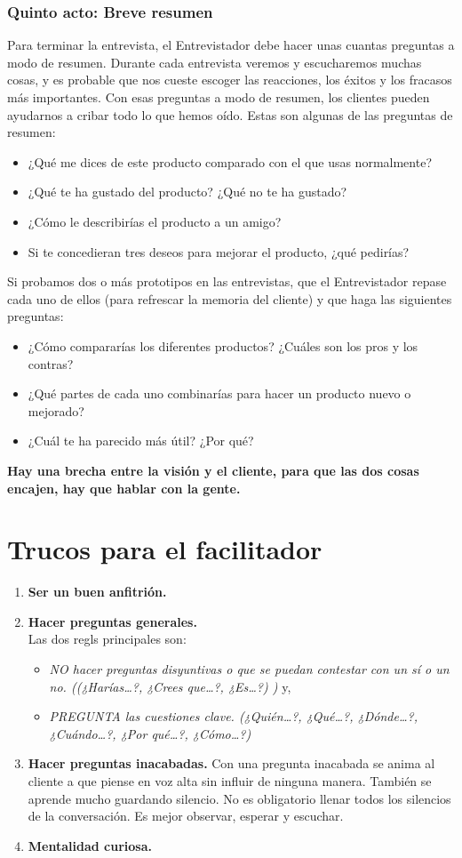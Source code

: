 \documentclass[10pt]{article}
\begin{document}
\begin{multicols}{2}
\subsubsection*{Quinto acto: Breve resumen}
Para terminar la entrevista, el Entrevistador debe hacer unas cuantas preguntas a modo de resumen. Durante cada entrevista veremos y escucharemos muchas cosas, y es probable que nos cueste escoger las reacciones, los éxitos y los fracasos más importantes. Con esas preguntas a modo de resumen, los clientes pueden ayudarnos a cribar todo lo que hemos oído. Estas son algunas de las preguntas de resumen:
\begin{itemize}
\item ¿Qué me dices de este producto comparado con el que usas normalmente?
\item ¿Qué te ha gustado del producto? ¿Qué no te ha gustado?
\item ¿Cómo le describirías el producto a un amigo?
\item Si te concedieran tres deseos para mejorar el producto, ¿qué pedirías?
\end{itemize}
Si probamos dos o más prototipos en las entrevistas, que el Entrevistador repase cada uno de ellos (para refrescar la memoria del cliente) y que haga las siguientes preguntas:
\begin{itemize}
\item ¿Cómo compararías los diferentes productos? ¿Cuáles son los pros y los contras?
\item ¿Qué partes de cada uno combinarías para hacer un producto nuevo o mejorado?
\item ¿Cuál te ha parecido más útil? ¿Por qué?
\end{itemize}
\textbf{Hay una brecha entre la visión y el cliente, para que las dos cosas encajen, hay que hablar con la gente.}
\section*{Trucos para el facilitador}
\begin{enumerate}[\bfseries 1.]
\item \textbf{Ser un buen anfitrión.}
\item \textbf{Hacer preguntas generales.} \\
Las dos regls principales son:
\begin{itemize}
\item \textit{NO hacer preguntas disyuntivas o que se puedan contestar con un sí o un no. ((¿Harías…?, ¿Crees que…?, ¿Es…?) )} y,
\item \textit{PREGUNTA las cuestiones clave. (¿Quién…?, ¿Qué…?, ¿Dónde…?, ¿Cuándo…?, ¿Por qué…?, ¿Cómo…?)}
\end{itemize}  
\item \textbf{Hacer preguntas inacabadas.} Con una pregunta inacabada se anima al cliente a que piense en voz alta sin influir de ninguna manera. También se aprende mucho guardando silencio. No es obligatorio llenar todos los silencios de la conversación. Es mejor observar, esperar y escuchar.
\item \textbf{Mentalidad curiosa.} 
\end{enumerate}

\end{multicols}
\end{document}
